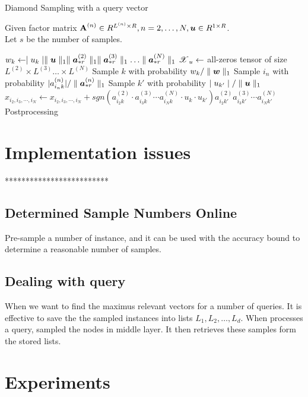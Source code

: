 \documentclass{article}
\newcommand{\Sca}[3]{{#1}^{(#2)}_{i_#2#3}}%
\newcommand{\T}[1]{\boldsymbol{\mathscr{\MakeUppercase{#1}}}}%
\newcommand{\V}[1]{{\bm{{\MakeLowercase{#1}}}}}%
\newcommand{\Vacol}[1]{\V{a}^{(#1)}_{*r}}
\newcommand{\M}[1]{{\bm{\mathbf{\MakeUppercase{#1}}}}}%
\newcommand{\norm}[2]{\parallel#1\parallel_{#2}}
\begin{document}
\begin{algorithm}[ht]
    \caption{Diamond Sampling with a query vector}
    \label{alg:DSamplingU}
    Given factor matrix $\M{A}^{(n)}\in R^{L^{(n)}\times R}, n = 2,\ldots,N,\V{U}\in R^{1\times R}$.\\
    Let $s$ be the number of samples.
    \begin{algorithmic}[1]
    \State \label{line:StartU}
    $w_k \leftarrow \mid u_k \mid\norm{\V{U}}{1}
    \norm{\Vacol{2}}{1}\norm{\Vacol{3}}{1}\ldots\norm{\Vacol{N}}{1} $
    \EndFor
    \State $\T{X}_u \leftarrow$ all-zeros tensor of size
    $L^{(2)}\times L^{(3)}\ldots\times L^{(N)}$
    \State Sample $k$ with probability $w_k/\norm{\V{w}}{1}$
    \label{line:Samplek}
    \State Sample $i_n$ with probability $|\Sca{a}{n}{k}|/\norm{\Vacol{n}}{1}$
    \label{line:in}
    \EndFor
    \State Sample $k'$ with probability $\mid u_{k'}\mid/\norm{\V{U}}{1}$
    \label{line:kp}
    \State $x_{i_2,i_3,\cdots,i_N}\leftarrow x_{i_2,i_3,\cdots,i_N} +
    sgn(\Sca{a}{2}{k}\cdot\Sca{a}{3}{k}\cdots\Sca{a}{N}{k}\cdot u_k\cdot u_{k'})
    \Sca{a}{2}{k'}\Sca{a}{3}{k'}\cdots\Sca{a}{N}{k'}$
    \label{line:update}
    \EndFor
    \State Postprocessing
    \end{algorithmic}
\end{algorithm}



\section{Implementation issues}
*************************\\
\subsection{Determined Sample Numbers Online }
Pre-sample a number of instance, and it can be used with the accuracy bound to determine a reasonable number of samples.
\subsection{Dealing with query}
When we want to find the maximus relevant vectors for a number of queries. It is effective to save the the sampled instances into lists $L_1,L_2,\ldots,L_d$. When processes a query, sampled the nodes in middle layer. It then retrieves these samples form the stored lists.
\section{Experiments}
\end{document}
